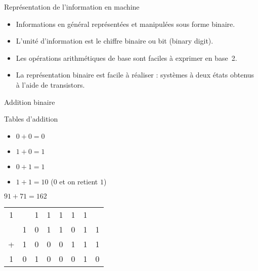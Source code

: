 \newcommand{\carry}{\scriptsize{1}}

\begin{frame}{Représentation de l'information en machine}
  \begin{itemize}
  \item Informations en général représentées et manipulées sous forme binaire.
  \item L’unité d’information est le chiffre binaire ou bit (binary digit).
  \item Les opérations arithmétiques de base sont faciles à exprimer en base~2.
  \item La représentation binaire est facile à réaliser : systèmes à deux états obtenus à l’aide de transistors.
  \end{itemize}
\end{frame}



\begin{frame}{Addition binaire}
    \begin{block}{Tables d'addition}
    \begin{itemize}
    \item $0 + 0 = 0$
    \item $1 + 0 = 1$
    \item $0 + 1 = 1$
    \item $1 + 1 = 10$ ($0$ et on retient $1$)
    \end{itemize}
  \end{block}

  \begin{exampleblock}{$91+71=162$}
    \begin{tabular}{c*{7}{@{\,}c}}
      \carry &   & \carry & \carry & \carry & \carry & \carry &   \\
             & 1 & 0      & 1      & 1      & 0      & 1      & 1 \\
      +      & 1 & 0      & 0      & 0      & 1      & 1      & 1 \\
            & 0 & 1      & 0      & 0      & 0      & 1      & 0 
    \end{tabular}
  \end{exampleblock}

\end{frame}

